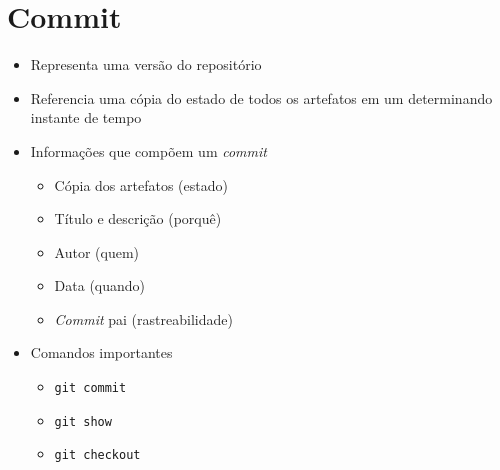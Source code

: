 \documentclass{beamer}
\newenvironment{slide}{\begin{frame}{\insertsection}}{\end{frame}}
\begin{document}
\section{Commit}
\begin{slide}
    \begin{itemize}
        \item Representa uma versão do repositório
        \pause
        \item Referencia uma cópia do estado de todos os artefatos em um
            determinando instante de tempo
        \pause
        \item Informações que compõem um \emph{commit}
        \begin{itemize}
            \pause
            \item Cópia dos artefatos \pause (estado)
            \pause
            \item Título e descrição \pause (porquê)
            \pause
            \item Autor \pause (quem)
            \pause
            \item Data \pause (quando)
            \pause
            \item \emph{Commit} pai \pause (rastreabilidade)
        \end{itemize}
        \pause
        \item Comandos importantes
        \begin{itemize}
            \pause
            \item \texttt{git commit}
            \pause
            \item \texttt{git show}
            \pause
            \item \texttt{git checkout}
        \end{itemize}
    \end{itemize}
\end{slide}
\end{document}
